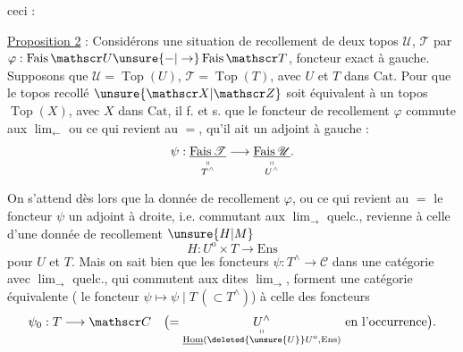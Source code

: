  ceci :

\uline{Proposition 2} : Considérons une situation de recollement
de deux topos $\mathscr U$, $\mathscr T$ par $\varphi:\operatorname{Fais}\mathscr U\unsure{-|\to}\operatorname{Fais}\mathscr T$,
foncteur exact à gauche. Supposons que $\mathscr U=\operatorname{Top}(U)$,
$\mathscr T=\operatorname{Top}(T)$, avec $U$ et $T$ dans $\mathrm{Cat}$. Pour que
le topos recollé $\unsure{\mathscr X|\mathscr Z}$ soit équivalent à un topos
$\operatorname{Top}(X)$, avec $X$ dans $\mathrm{Cat}$, il f. et s. que
le foncteur de recollement $\varphi$ commute aux
$\lim_{\leftarrow}$  ou ce qui revient au $=$,
qu'il ait un adjoint à gauche :
\[
\psi:\underset{\substack{\shortparallel\\T^\wedge}}{\underline{\operatorname{Fais}\mathscr T}}
\longrightarrow\underset{\substack{\shortparallel\\U^\wedge}}{\underline{\operatorname{Fais}\mathscr U}} .
\]

On s'attend dès lors que  la donnée de
recollement $\varphi$, ou ce qui revient au $=$ le
foncteur $\psi$  un adjoint à droite, i.e.
commutant aux $\lim_{\rightarrow}$ quelc., revienne à
celle d'une donnée de recollement $\unsure{H|M}$
\[
H:U^{\mathrm o}\times T\longrightarrow\mathrm{Ens}
\]
pour $U$ et $T$. Mais on sait bien que
les foncteurs $\psi:T^\wedge\longrightarrow\mathscr C$ dans une
catégorie  avec $\lim_{\rightarrow}$ quelc., qui commutent
aux dites $\lim_{\rightarrow}$, forment une catégorie
équivalente ( le foncteur $\psi\longmapsto\psi\mid T\,(\subset T^\wedge)$)
à celle des  foncteurs
\[
\psi_0:T\longrightarrow\mathscr C
\quad \bigl(=\underset{\substack{\shortparallel\\\underline{\operatorname{Hom}}(\deleted{\unsure{U}}U^{\mathrm o},\mathrm{Ens})}}{U^\wedge}
\text{ en l'occurrence}\bigr).
\]
